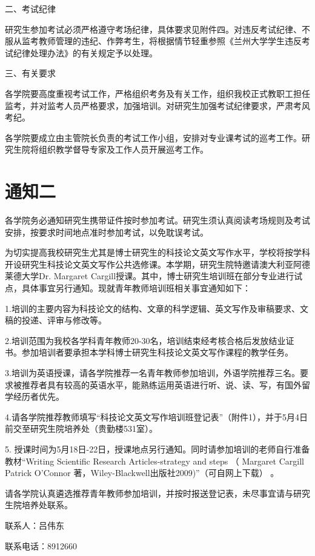 二、考试纪律

研究生参加考试必须严格遵守考场纪律，具体要求见附件四。对违反考试纪律、不服从监考教师管理的违纪、作弊考生，将根据情节轻重参照《兰州大学学生违反考试纪律处理办法》的有关规定予以处理。

三、有关要求

各学院要高度重视考试工作，严格组织考务及有关工作，组织我校正式教职工担任监考，并对监考人员严格要求，加强培训。对研究生加强考试纪律要求，严肃考风考纪。

各学院要成立由主管院长负责的考试工作小组，安排对专业课考试的巡考工作。研究生院将组织教学督导专家及工作人员开展巡考工作。

\section{通知二}
各学院务必通知研究生携带证件按时参加考试。研究生须认真阅读考场规则及考试安排，按要求时间地点准时参加考试，以免耽误考试。

为切实提高我校研究生尤其是博士研究生的科技论文英文写作水平，学校将按学科开设研究生科技论文英文写作公共选修课。本学期，研究生院特邀请澳大利亚阿德莱德大学Dr. Margaret Cargill授课。其中，博士研究生培训班在部分专业进行试点，具体事宜另行通知。现就青年教师培训班相关事宜通知如下：

1.培训的主要内容为科技论文的结构、文章的科学逻辑、英文写作及审稿要求、文稿的投递、评审与修改等。

2.培训范围为我校各学科青年教师20-30名，培训结束经考核合格后发放结业证书。参加培训者要承担本学科博士研究生科技论文英文写作课程的教学任务。

3.培训为英语授课，请各学院推荐一名青年教师参加培训，外语学院推荐三名。要求被推荐者具有较高的英语水平，能熟练运用英语进行听、说、读、写，有国外留学经历者优先。

4.请各学院推荐教师填写“科技论文英文写作培训班登记表”（附件1），并于5月4日前交至研究生院培养处（贵勤楼531室）。

5. 授课时间为5月18日-22日，授课地点另行通知。同时请参加培训的老师自行准备教材“Writing Scientific Research Articles-strategy and steps （ Margaret Cargill Patrick O’Connor 著，Wiley-Blackwell出版社2009)”（可自网上下载） 。

请各学院认真遴选推荐青年教师参加培训，并按时报送登记表，未尽事宜请与研究生院培养处联系。

联系人：吕伟东

联系电话：8912660

